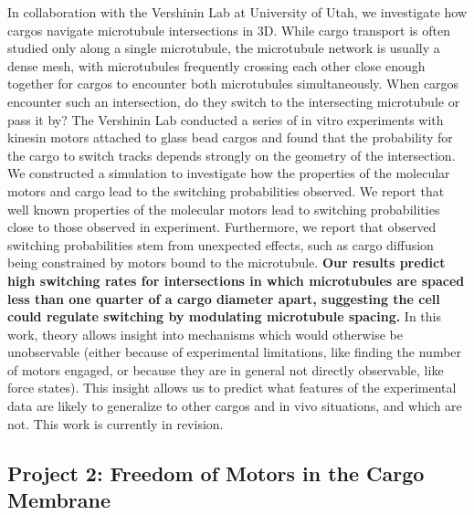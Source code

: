 {In collaboration with the Vershinin Lab at University of Utah, we investigate how cargos navigate microtubule intersections in 3D. While cargo transport is often studied only along a single microtubule, the microtubule network is usually a dense mesh, with microtubules frequently crossing each other close enough together for cargos to encounter both microtubules simultaneously. When cargos encounter such an intersection, do they switch to the intersecting microtubule or pass it by? The Vershinin Lab conducted a series of in vitro experiments with kinesin motors attached to glass bead cargos and found that the probability for the cargo to switch tracks depends strongly on the geometry of the intersection. We constructed a simulation to investigate how the properties of the molecular motors and cargo lead to the switching probabilities observed. We report that well known properties of the molecular motors lead to switching probabilities close to those observed in experiment. Furthermore, we report that observed switching probabilities stem from unexpected effects, such as cargo diffusion being constrained by motors bound to the microtubule. \textbf{Our results predict high switching rates for intersections in which microtubules are spaced less than one quarter of a cargo diameter apart, suggesting the cell could regulate switching by modulating microtubule spacing.} In this work, theory allows insight into mechanisms which would otherwise be unobservable (either because of experimental limitations, like finding the number of motors engaged, or because they are in general not directly observable, like force states). This insight allows us to predict what features of the experimental data are likely to generalize to other cargos and in vivo situations, and which are not. This work is currently in revision.

\subsection*{Project 2: Freedom of Motors in the Cargo Membrane}

}
